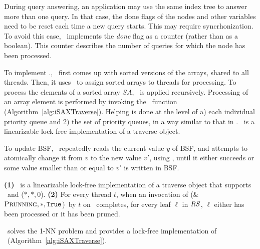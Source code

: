     
    During query answering, an application may use the same index tree
    to answer more than one query. In that case, the done flags of the nodes and other
    variables need to be reset each time a new query starts. This may require syncrhonization. 
    To avoid this case, \Fresh\ implements the {\em done} flag as a counter (rather than as a boolean). 
    This counter describes the number of queries for which the node has been processed.
    
    To implement \RS.\Traverse, \Fresh\ first comes up with sorted versions of the arrays,
    shared to all threads. Then, it uses \Refresh\ to assign sorted arrays to threads 
    for processing. To process the elements of a sorted array $SA$, \Refresh\ is
    applied recursively. 
    Processing of an array element is performed by invoking the \Refinement\ function
    (Algorithm~\ref{alg:iSAXTraverse}). Helping is done at the level of 
    a) each individual priority queue and 
    2) the set of priority queues, in a way similar to that in \PS.
    \RS\ is a linearizable lock-free implementation of a traverse object. 
    
    To update BSF, \Fresh\ repeatedly reads the current value $y$ of BSF, and attempts to
    atomically change it from $v$ to the new value $v'$, using \CAS, until it either succeeds or some value 
    smaller than or equal to $v'$ is written in BSF.
    
    \begin{lemma}
    \label{lem:rs}
    {\bf (1)} \RS\ is a linearizable lock-free implementation of a traverse object that supports \Put\ and
    \Traverse($\mathit{*, *, 0}$). 
    {\bf (2)} For every thread $t$, when an invocation of \Traverse(\&$\mathit{\mbox{\sc Prunning}, *, \mbox{\texttt{True}}}$)\ by $t$ on \RS\ completes, 
    for every leaf $\ell$ in $\mbox{$\mathit{RS}$}$, $\ell$ either has been processed or it has been pruned.
    \end{lemma}
    
    \begin{theorem}
    \label{thm:qa}
    \Fresh\ solves the 1-NN problem and provides a lock-free implementation of \QueryAnswering\
    (Algorithm~\ref{alg:iSAXTraverse}). 
    \end{theorem}
